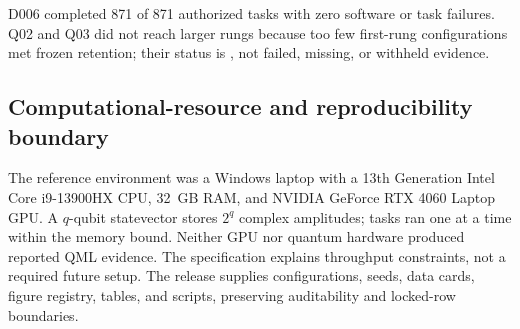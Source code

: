 D006 completed 871 of 871 authorized tasks with zero software or task
failures. Q02 and Q03 did not reach larger rungs because too few first-rung
configurations met frozen retention; their status is
, not failed, missing, or
withheld evidence.

\subsection{Computational-resource and reproducibility boundary}

The reference environment was a Windows laptop with a 13th Generation Intel
Core i9-13900HX CPU, 32~GB RAM, and NVIDIA GeForce RTX 4060 Laptop GPU. A
$q$-qubit statevector stores $2^q$ complex amplitudes; tasks ran one at a time
within the memory bound. Neither GPU nor quantum hardware produced reported QML
evidence. The specification explains throughput constraints, not a required
future setup. The release supplies configurations, seeds, data cards, figure
registry, tables, and scripts, preserving auditability and locked-row boundaries.
